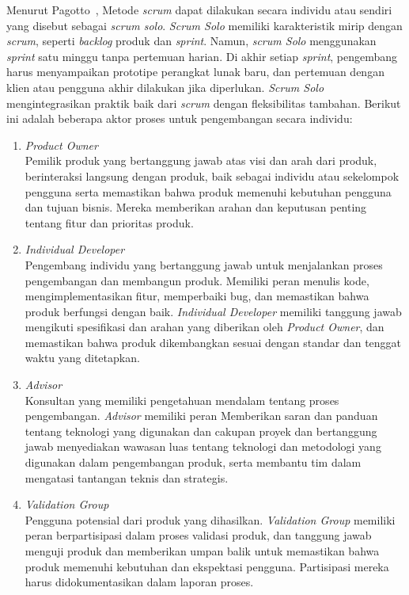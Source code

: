 \FloatBarrier
%
Menurut Pagotto~\cite{7521555}, Metode \textit{scrum} dapat dilakukan secara individu atau sendiri yang disebut sebagai \textit{scrum solo}. \textit{Scrum Solo} memiliki karakteristik mirip dengan \textit{scrum}, seperti \textit{backlog} produk dan \textit{sprint}. Namun, \textit{scrum Solo} menggunakan \textit{sprint} satu minggu tanpa pertemuan harian. Di akhir setiap \textit{sprint}, pengembang harus menyampaikan prototipe perangkat lunak baru, dan pertemuan dengan klien atau pengguna akhir dilakukan jika diperlukan. \textit{Scrum Solo} mengintegrasikan praktik baik dari \textit{scrum} dengan fleksibilitas tambahan. Berikut ini adalah beberapa aktor proses untuk pengembangan secara individu:
\begin{enumerate}
    \item \textit{Product Owner}
    \\
    Pemilik produk yang bertanggung jawab atas visi dan arah dari produk, berinteraksi langsung dengan produk, baik sebagai individu atau sekelompok pengguna serta memastikan bahwa produk memenuhi kebutuhan pengguna dan tujuan bisnis. Mereka memberikan arahan dan keputusan penting tentang fitur dan prioritas produk.

    \item \textit{Individual Developer}
    \\
    Pengembang individu yang bertanggung jawab untuk menjalankan proses pengembangan dan membangun produk. Memiliki peran menulis kode, mengimplementasikan fitur, memperbaiki bug, dan memastikan bahwa produk berfungsi dengan baik. \textit{Individual Developer} memiliki tanggung jawab mengikuti spesifikasi dan arahan yang diberikan oleh \textit{Product Owner}, dan memastikan bahwa produk dikembangkan sesuai dengan standar dan tenggat waktu yang ditetapkan.

    \item \textit{Advisor}
    \\
     Konsultan yang memiliki pengetahuan mendalam tentang proses pengembangan. \textit{Advisor} memiliki peran Memberikan saran dan panduan tentang teknologi yang digunakan dan cakupan proyek dan bertanggung jawab menyediakan wawasan luas tentang teknologi dan metodologi yang digunakan dalam pengembangan produk, serta membantu tim dalam mengatasi tantangan teknis dan strategis.

     \item \textit{Validation Group}
     \\
     Pengguna potensial dari produk yang dihasilkan. \textit{Validation Group} memiliki peran berpartisipasi dalam proses validasi produk, dan tanggung jawab menguji produk dan memberikan umpan balik untuk memastikan bahwa produk memenuhi kebutuhan dan ekspektasi pengguna. Partisipasi mereka harus didokumentasikan dalam laporan proses.
    
\end{enumerate}

